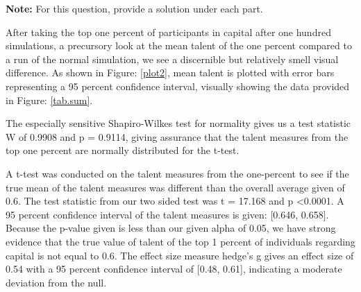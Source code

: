 \documentclass{article}\usepackage[]{graphicx}\usepackage[]{xcolor}
\makeatletter
\newcommand{\hlnum}[1]{\textcolor[rgb]{0.686,0.059,0.569}{#1}}%
\newcommand{\hlopt}[1]{\textcolor[rgb]{0,0,0}{#1}}%
\newcommand{\hldef}[1]{\textcolor[rgb]{0.345,0.345,0.345}{#1}}%
\newcommand{\hlkwc}[1]{\textcolor[rgb]{0.333,0.667,0.333}{#1}}%
\newcommand{\hlkwd}[1]{\textcolor[rgb]{0.737,0.353,0.396}{\textbf{#1}}}%
\newenvironment{kframe}{%
 \def\at@end@of@kframe{}%
 \ifinner\ifhmode%
  \def\at@end@of@kframe{\end{minipage}}%
  \begin{minipage}{\columnwidth}%
 \fi\fi%
 \def\FrameCommand##1{\hskip\@totalleftmargin \hskip-\fboxsep
 \colorbox{shadecolor}{##1}\hskip-\fboxsep
     \hskip-\linewidth \hskip-\@totalleftmargin \hskip\columnwidth}%
 \MakeFramed {\advance\hsize-\width
   \@totalleftmargin\z@ \linewidth\hsize
   \@setminipage}}%
 {\par\unskip\endMakeFramed%
 \at@end@of@kframe}
\newenvironment{knitrout}{}{} %
\makeatother
\begin{document}
\begin{enumerate}
\textbf{Note:} For this question, provide a solution under each part.

After taking the top one percent of participants in capital after one hundred simulations, a precursory look at the mean talent of the one percent compared to a run of the normal simulation, we see a discernible but relatively smell visual difference. As shown in Figure:  \ref{plot2}, mean talent is plotted with error bars representing a 95 percent confidence interval, visually showing the data provided in Figure: \ref{tab.sum}. 

The especially sensitive Shapiro-Wilkes test for normality gives us a test statistic W of 0.9908 and p = 0.9114, giving assurance that the talent measures from the top one percent are normally distributed for the t-test. 

A t-test was conducted on the talent measures from the one-percent to see if the true mean of the talent measures was different than the overall average given of 0.6. The test statistic from our two sided test was t = 17.168 and p \textless 0.0001. A 95 percent confidence interval of the talent measures is given: [0.646, 0.658]. Because the p-value given is less than our given alpha of 0.05, we have strong evidence that the true value of talent of the top 1 percent of individuals regarding capital is not equal to 0.6. The effect size measure hedge's g gives an effect size of 0.54 with a 95 percent confidence interval of [0.48, 0.61], indicating a moderate deviation from the null. 


\end{enumerate}
\end{document}
